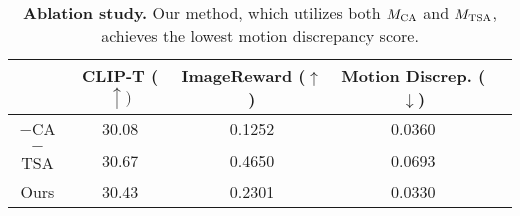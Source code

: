 \begin{table}[t]
  \centering
\begin{tabular}{ccccc}
  \toprule
  &CLIP-T ($\uparrow) $ &ImageReward ($\uparrow$) & \makecell{Motion\\Discrep. ($\downarrow$)} \\ \midrule
  $-$CA&30.08&0.1252&0.0360 \\
  $-$TSA&30.67&0.4650&0.0693 \\
  Ours&30.43&0.2301&0.0330 \\
  \bottomrule
  \end{tabular}
  \caption{{\bf Ablation study.} Our method, which utilizes both $M_{{\rm CA}}$ and $M_{{\rm TSA}}$, achieves the lowest motion discrepancy score.}
  \label{tab:ablation_quant}
\end{table}